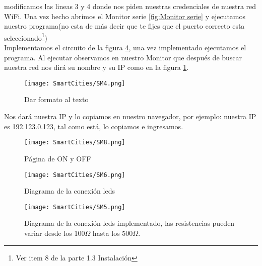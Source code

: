 \documentclass[11pt,fleqn]{book} %
\begin{document}
modificamos las lineas 3 y 4 donde nos piden nuestras credenciales de nuestra red WiFi. Una vez hecho abrimos el Monitor serie \ref{fig:Monitor serie} y ejecutamos nuestro programa(no esta de más decir que te fijes que el puerto correcto esta seleccionado\footnote{Ver item 8 de la parte 1.3 Instalación})\\
Implementamos el circuito de la figura \ref{fig:espleds2}, una vez implementado ejecutamos el programa.
Al ejecutar observamos en nuestro Monitor que después de buscar nuestra red nos dirá su nombre y su IP como en la figura \ref{fig:wifi+ip}.
\begin{figure}[h]
\centering\texttt{[image: SmartCities/SM4.png]}
\caption{Dar formato al texto}
\label{fig:wifi+ip}
\end{figure}
Nos dará nuestra IP y lo copiamos en nuestro navegador, por ejemplo: nuestra IP es 192.123.0.123, tal como está, lo copiamos e ingresamos.
\begin{figure}[h]
\centering
\texttt{[image: SmartCities/SM8.png]}
\caption{Página de ON y OFF}
\label{fig:paginaonoff}
\end{figure}
\begin{figure}[h!]
\centering
\texttt{[image: SmartCities/SM6.png]}
\caption{Diagrama de la conexión leds}
\label{espleds1}
\end{figure}
\begin{figure}[h!]
\centering
\texttt{[image: SmartCities/SM5.png]}
\caption{Diagrama de la conexión leds implementado, las resistencias pueden variar desde los 100$\Omega$ hasta los 500$\Omega$.}
\label{fig:espleds2}
\end{figure}
\newpage
\end{document}
